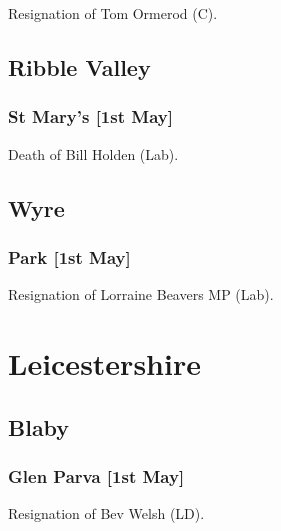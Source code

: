 \documentclass[a4paper,openany]{book}
\begin{document}
\begin{resultsiii}
Resignation of Tom Ormerod (C).

\subsection*{Ribble Valley}

\subsubsection*{St Mary's \hspace*{\fill}\nolinebreak[1]%
	\enspace\hspace*{\fill}
	[1st May]}


Death of Bill Holden (Lab).

\subsection*{Wyre}

\subsubsection*{Park \hspace*{\fill}\nolinebreak[1]%
	\enspace\hspace*{\fill}
	[1st May]}


Resignation of Lorraine Beavers MP (Lab).

\section{Leicestershire}

\subsection*{Blaby}

\subsubsection*{Glen Parva \hspace*{\fill}\nolinebreak[1]%
	\enspace\hspace*{\fill}
	[1st May]}


Resignation of Bev Welsh (LD).


\end{resultsiii}
\end{document}
